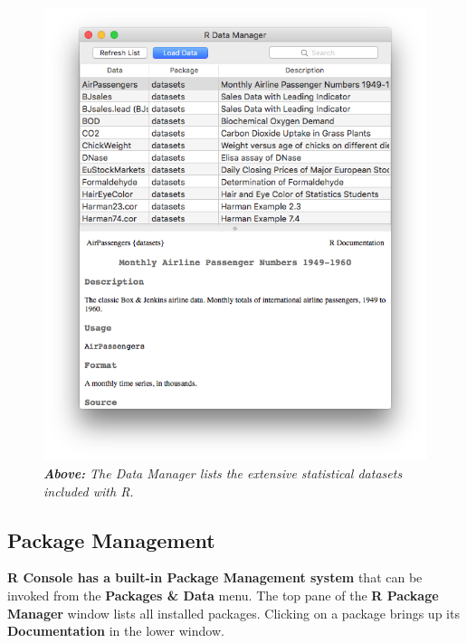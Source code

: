 \documentclass[]{book}
\theoremstyle{definition}
\theoremstyle{definition}
\theoremstyle{definition}
\theoremstyle{remark}
\begin{document}
\begin{figure}
\centering
\includegraphics{images/R_Data_Manager.png}
\caption{\emph{\textbf{Above:} The Data Manager lists the extensive
statistical datasets included with R.}}
\end{figure}

\hypertarget{package-management}{%
\subsection{Package Management}\label{package-management}}

\textbf{R Console has a built-in Package Management system} that can be
invoked from the \textbf{Packages \& Data} menu. The top pane of the
\textbf{R Package Manager} window lists all installed packages. Clicking
on a package brings up its \textbf{Documentation} in the lower window.
\end{document}
